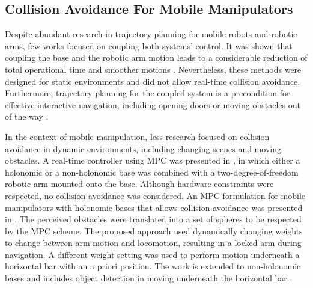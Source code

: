 \subsection{Collision Avoidance For Mobile Manipulators}
Despite abundant research in trajectory planning for mobile robots and robotic
arms, few works focused on coupling both systems' control. It was shown that
coupling the base and the robotic arm motion leads to a considerable reduction
of total operational time and smoother motions \cite{Thakar2018, Thakar2019}.
Nevertheless, these methods were designed for static environments and did not
allow real-time collision avoidance. Furthermore, trajectory planning for the
coupled system is a precondition for effective interactive navigation, including
opening doors \cite{Jain2009, Chitta2010} or moving obstacles out of the way
\cite{Li2019}.

In the context of mobile manipulation, less research focused on collision
avoidance in dynamic environments, including changing scenes and moving
obstacles. A real-time controller using MPC was presented in \cite{Ide2011}, in
which either a holonomic or a non-holonomic base was combined with a
two-degree-of-freedom robotic arm mounted onto the base. Although hardware
constraints were respected, no collision avoidance was considered.  An MPC
formulation for mobile manipulators with holonomic bases that allows collision
avoidance was presented in \cite{Avanzini2015}. The perceived obstacles were
translated into a set of spheres to be respected by the MPC scheme. The proposed
approach used dynamically changing weights to change between arm motion and
locomotion, resulting in a locked arm during navigation. A different weight
setting was used to perform motion underneath a horizontal bar with an a priori
position. The work is extended to non-holonomic bases and includes object
detection in moving underneath the horizontal bar \cite{Avanzini2018}. 
